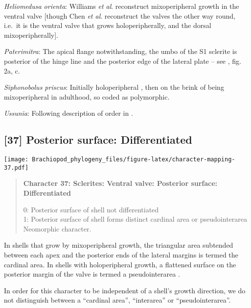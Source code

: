 \documentclass[openany]{book}
\theoremstyle{definition}
\theoremstyle{definition}
\theoremstyle{definition}
\theoremstyle{remark}
\begin{document}
\hypertarget{Heliomedusa_orienta-coding-36}{}
\emph{Heliomedusa orienta}: Williams \emph{et al}.
\citeyearpar[2007]{Williams2000LinguliformeaCraniiformea} reconstruct
mixoperipheral growth in the ventral valve {[}though Chen \emph{et al}.
\citeyearpar{Chen2007Reinterpretationof} reconstruct the valves the
other way round, i.e.~it is the ventral valve that grows
holoperipherally, and the dorsal mixoperipherally{]}.

\hypertarget{Paterimitra-coding-36}{}
\emph{Paterimitra}: The apical flange notwithstanding, the umbo of the
S1 sclerite is posterior of the hinge line and the posterior edge of the
lateral plate -- see \citet{Larsson2014iPaterimitra}, fig. 2a, c.

\hypertarget{Siphonobolus_priscus-coding-36}{}
\emph{Siphonobolus priscus}: Initially holoperipheral
\citep[p.~159]{Popov2009Earlyontogeny}, then on the brink of being
mixoperipheral in adulthood, so coded as polymorphic.

\hypertarget{Ussunia-coding-36}{}
\emph{Ussunia}: Following description of order in
\citet{Williams2000LinguliformeaCraniiformea}.

\subsection*{{[}37{]} Posterior surface:
Differentiated}\label{posterior-surface-differentiated-1}

\texttt{[image: Brachiopod\_phylogeny\_files/figure-latex/character-mapping-37.pdf]}

\begin{quote}
\textbf{Character 37: Sclerites: Ventral valve: Posterior surface:
Differentiated}

0: Posterior surface of shell not differentiated\\
1: Posterior surface of shell forms distinct cardinal area or
pseudointerarea\\
Neomorphic character.
\end{quote}

In shells that grow by mixoperipheral growth, the triangular area
subtended between each apex and the posterior ends of the lateral
margins is termed the cardinal area. In shells with holoperipheral
growth, a flattened surface on the posterior margin of the valve is
termed a pseudointerarea
\citep[paraphrasing][]{Williams1997Introduction}.

In order for this character to be independent of a shell's growth
direction, we do not distinguish between a ``cardinal area'',
``interarea'' or ``pseudointerarea''.
\end{document}
